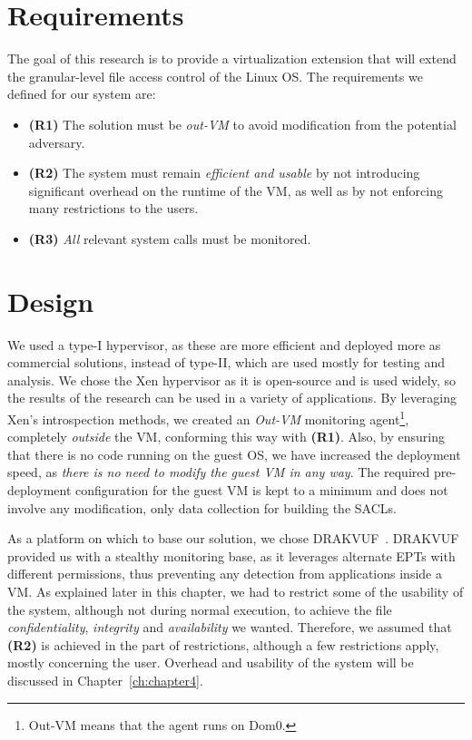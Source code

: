 \section{Requirements}\label{sec:requirements}
The goal of this research is to provide a virtualization extension that will extend the granular-level file access control of the Linux \ac{OS}. The requirements we defined for our system are:
\begin{itemize}
	\item \textbf{(R1)} The solution must be \emph{out-\ac{VM}} to avoid modification from the potential adversary. 
	\item \textbf{(R2)} The system must remain \emph{efficient and usable} by not introducing significant overhead on the runtime of the \ac{VM}, as well as by not enforcing many restrictions to the users. 
	\item \textbf{(R3)} \emph{All} relevant system calls must be monitored.
\end{itemize}


\section{Design}\label{sec:design}

\par We used a type-I hypervisor, as these are more efficient and deployed more as commercial solutions, instead of type-II, which are used mostly for testing and analysis. We chose the Xen hypervisor as it is open-source and is used widely, so the results of the research can be used in a variety of applications. By leveraging Xen's introspection methods, we created an \emph{Out-\ac{VM}} monitoring agent\footnote{Out-\ac{VM} means that the agent runs on Dom0.}, completely \emph{outside} the \ac{VM}, conforming this way with \textbf{(R1)}. Also, by ensuring that there is no code running on the guest \ac{OS}, we have increased the deployment speed, as \emph{there is no need to modify the guest \ac{VM} in any way}. The required pre-deployment configuration for the guest \ac{VM} is kept to a minimum and does not involve any modification, only data collection for building the \acp{SACL}.

\par As a platform on which to base our solution, we chose DRAKVUF~\cite{lengyel2014drakvuf}. DRAKVUF provided us with a stealthy monitoring base, as it leverages alternate \ac{EPT}s with different permissions, thus preventing any detection from applications inside a \ac{VM}. As explained later in this chapter, we had to restrict some of the usability of the system, although not during normal execution, to achieve the file \emph{confidentiality}, \emph{integrity} and \emph{availability} we wanted. Therefore, we assumed that \textbf{(R2)} is achieved in the part of restrictions, although a few restrictions apply, mostly concerning the  user. Overhead and usability of the system will be discussed in Chapter~\ref{ch:chapter4}.

